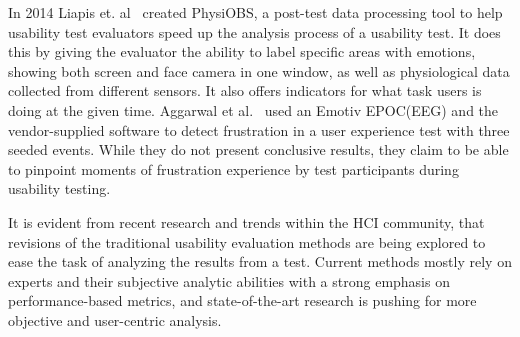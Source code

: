 In 2014 Liapis et. al~\cite{fusion4} created PhysiOBS, a post-test data processing tool to help usability test evaluators speed up the analysis process of a usability test. It does this by giving the evaluator the ability to label specific areas with emotions, showing both screen and face camera in one window, as well as physiological data collected from different sensors. It also offers indicators for what task users is doing at the given time.
Aggarwal et al.~\cite{sensor_example} used an Emotiv EPOC(EEG) and the vendor-supplied software to detect frustration in a
user experience test with three seeded events. While they do not present conclusive results, they claim to be able to
pinpoint moments of frustration experience by test participants during usability testing.

It is evident from recent research and trends within the HCI community, that revisions of the traditional usability
evaluation methods are being explored to ease the task of analyzing the results from a test.
Current methods mostly rely on experts and their subjective analytic abilities with a strong emphasis on performance-based
metrics, and state-of-the-art research is pushing for more objective and user-centric analysis.
